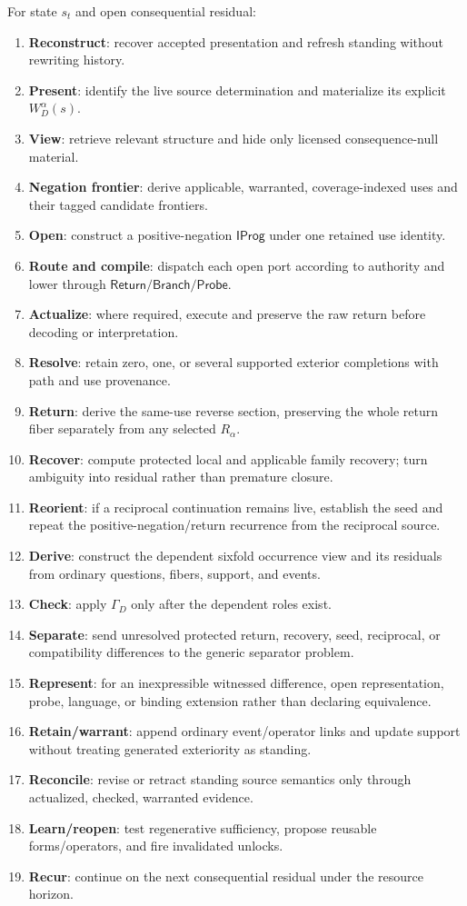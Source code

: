 \documentclass[11pt,oneside]{article}
\begin{document}
For state \(s_t\) and open consequential residual:
\begin{enumerate}
\item \textbf{Reconstruct}: recover accepted presentation and refresh standing without rewriting history.
\item \textbf{Present}: identify the live source determination and materialize its explicit \(W_D^\alpha(s)\).
\item \textbf{View}: retrieve relevant structure and hide only licensed consequence-null material.
\item \textbf{Negation frontier}: derive applicable, warranted, coverage-indexed uses and their tagged candidate frontiers.
\item \textbf{Open}: construct a positive-negation \(\mathsf{IProg}\) under one retained use identity.
\item \textbf{Route and compile}: dispatch each open port according to authority and lower through \(\mathsf{Return}/\mathsf{Branch}/\mathsf{Probe}\).
\item \textbf{Actualize}: where required, execute and preserve the raw return before decoding or interpretation.
\item \textbf{Resolve}: retain zero, one, or several supported exterior completions with path and use provenance.
\item \textbf{Return}: derive the same-use reverse section, preserving the whole return fiber separately from any selected \(R_\alpha\).
\item \textbf{Recover}: compute protected local and applicable family recovery; turn ambiguity into residual rather than premature closure.
\item \textbf{Reorient}: if a reciprocal continuation remains live, establish the seed and repeat the positive-negation/return recurrence from the reciprocal source.
\item \textbf{Derive}: construct the dependent sixfold occurrence view and its residuals from ordinary questions, fibers, support, and events.
\item \textbf{Check}: apply \(\Gamma_D\) only after the dependent roles exist.
\item \textbf{Separate}: send unresolved protected return, recovery, seed, reciprocal, or compatibility differences to the generic separator problem.
\item \textbf{Represent}: for an inexpressible witnessed difference, open representation, probe, language, or binding extension rather than declaring equivalence.
\item \textbf{Retain/warrant}: append ordinary event/operator links and update support without treating generated exteriority as standing.
\item \textbf{Reconcile}: revise or retract standing source semantics only through actualized, checked, warranted evidence.
\item \textbf{Learn/reopen}: test regenerative sufficiency, propose reusable forms/operators, and fire invalidated unlocks.
\item \textbf{Recur}: continue on the next consequential residual under the resource horizon.
\end{enumerate}
\end{document}
